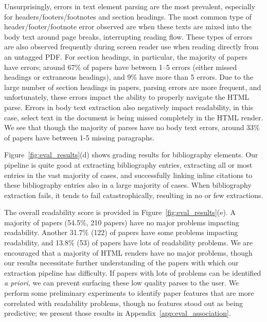 Unsurprisingly, errors in text element parsing are the most prevalent, especially for headers/footers/footnotes and section headings. The most common type of header/footer/footnote error observed are when these texts are mixed into the body text around page breaks, interrupting reading flow. These types of errors are also observed frequently during screen reader use when reading directly from an untagged PDF. For section headings, in particular, the majority of papers have errors; around 67\% of papers have between 1--5 errors (either missed headings or extraneous headings), and 9\% have more than 5 errors. Due to the large number of section headings in papers, parsing errors are more frequent, and unfortunately, these errors impact the ability to properly navigate the HTML parse. 
Errors in body text extraction also negatively impact readability, in this case, select text in the document is being missed completely in the HTML render. We see that though the majority of parses have no body text errors, around 33\% of papers have between 1-5 missing paragraphs. 

Figure~\ref{fig:eval_results}(d) shows grading results for bibliography elements. Our pipeline is quite good at extracting bibliography entries, extracting all or most entries in the vast majority of cases, and successfully linking inline citations to these bibliography entries also in a large majority of cases. When bibliography extraction fails, it tends to fail catastrophically, resulting in no or few extractions.

The overall readability score is provided in Figure~\ref{fig:eval_results}(e). A majority of papers (54.5\%, 210 papers) have no major problems impacting readability. Another 31.7\% (122) of papers have some problems impacting readability, and 13.8\% (53) of papers have lots of readability problems. We are encouraged that a majority of HTML renders have no major problems, though our results necessitate further understanding of the papers with which our extraction pipeline has difficulty. If papers with lots of problems can be identified \textit{a priori}, we can prevent surfacing these low quality parses to the user. We perform some preliminary experiments to identify paper features that are more correlated with readability problems, though no features stood out as being predictive; we present those results in Appendix~\ref{app:eval_association}.

